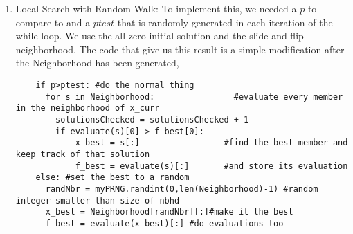 \documentclass[11pt]{article}
\begin{document}
\begin{enumerate}
\begin{verbatim}
k = 50
solns = [] #array for storing solutions values

for i in range(k):


  x_curr = initial_solution_random_start_feasible()  #x_curr will hold the current solution
  x_best = x_curr[:]           #x_best will hold the best solution
  f_curr = evaluate(x_curr)    #f_curr will hold the evaluation of the current soluton
  f_best = f_curr[:]
	...
  solns.append(solutionsChecked) #add pieces to solutions
  solns.append(f_best[0])
  solns.append(f_best[1])
  solns.append(np.sum(x_best))
  solns.append(x_best)
\end{verbatim}
Then the coolest part of code found the best solution from this array:
\begin{verbatim}
weightsMax = []

for i in range(0,k*5,5): #five things added to the solution array each execution
  weightsMax.append(solns[i+1]) #objective is in 1 slot

iter = weightsMax.index(max(weightsMax)) #find iteration with best value

print ("\nFinal number of solutions checked: ", solns[5*iter]) #print results
print ("Best value found: ", solns[5*iter+1])
print ("Weight is: ", solns[5*iter+2])
print ("Total number of items selected: ", solns[5*iter+3])
print ("Best solution: ", solns[5*iter+4])
\end{verbatim}

\item Local Search with Random Walk:  To implement this, we needed a $p$ to compare to and a $ptest$ that is randomly generated in each iteration of the while loop.  We use the all zero initial solution and the slide and flip neighborhood.  The code that give us this result is a simple modification after the Neighborhood has been generated,
\begin{verbatim}
    if p>ptest: #do the normal thing
      for s in Neighborhood:                #evaluate every member in the neighborhood of x_curr
        solutionsChecked = solutionsChecked + 1
        if evaluate(s)[0] > f_best[0]:
            x_best = s[:]                 #find the best member and keep track of that solution
            f_best = evaluate(s)[:]       #and store its evaluation
    else: #set the best to a random
      randNbr = myPRNG.randint(0,len(Neighborhood)-1) #random integer smaller than size of nbhd
      x_best = Neighborhood[randNbr][:]#make it the best 
      f_best = evaluate(x_best)[:] #do evaluations too
\end{verbatim} 


\end{enumerate}
\end{document}
